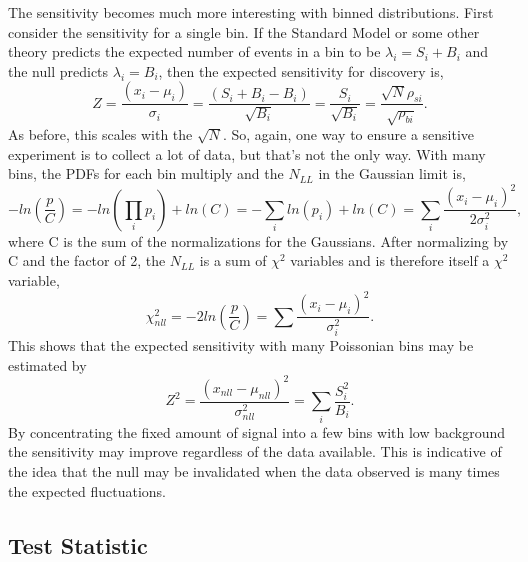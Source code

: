 \documentclass[12pt]{article}
\begin{document}
The sensitivity becomes much more interesting with binned distributions. First consider the sensitivity for a single bin. If the Standard Model or some other theory predicts the expected number of events in a bin to be $\lambda_i=S_i+B_i$ and the null predicts $\lambda_i=B_i$, then the expected sensitivity for discovery is,
\begin{equation}
Z = \frac{(x_i-\mu_i)}{\sigma_i} = \frac{(S_i+B_i-B_i)}{\sqrt{B_i}} = \frac{S_i}{\sqrt{B_i}} = \frac{\sqrt{N}\rho_{si}}{\sqrt{\rho_{bi}}}.
\end{equation}
As before, this scales with the $\sqrt{N}$. So, again, one way to ensure a sensitive experiment is to collect a lot of data, but that's not the only way. With many bins, the PDFs for each bin multiply and the $N_{LL}$ in the Gaussian limit is,
\begin{equation}
\label{eq:norm}
-ln\left(\frac{p}{C}\right) = -ln\left(\prod_i p_i\right) + ln\left( C \right) 
                            = -\sum_i ln\left(p_i\right) + ln\left( C \right) 
                            = \sum_i \frac{(x_i-\mu_i)^2}{2\sigma_i^2},
\end{equation}
where C is the sum of the normalizations for the Gaussians. After normalizing by C and the factor of 2, the $N_{LL}$ is a sum of $\chi^2$ variables and is therefore itself a $\chi^2$ variable, 
\begin{equation}
\chi^2_{nll} = -2ln\left(\frac{p}{C}\right) = \sum \frac{(x_i-\mu_i)^2}{\sigma_i^2}.
\end{equation}
This shows that the expected sensitivity with many Poissonian bins may be estimated by
\begin{equation}
Z^2 = \frac{(x_{nll}-\mu_{nll})^2}{\sigma_{nll}^2} = \sum_i \frac{S_i^2}{B_i}.  
\end{equation}
By concentrating the fixed amount of signal into a few bins with low background the sensitivity may improve regardless of the data available. This is indicative of the idea that the null may be invalidated when the data observed is many times the expected fluctuations.

\subsection{Test Statistic}
\end{document}
